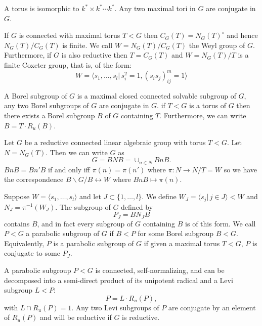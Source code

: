 A torus is isomorphic to $k^*\times k^*\cdots k^*$. Any two maximal tori in $G$ are conjugate in $G$. 

If $G$ is connected with maximal torus $T<G$ then $C_G(T) = N_G(T)^\circ$ and hence $N_G(T)/C_G(T)$ is finite. We call $W = N_G(T)/C_G(T)$ the Weyl group of $G$. Furthermore, if $G$ is also reductive then $T=C_G(T)$ and $W = N_G(T)/T$ is a finite Coxeter group, that is, of the form:
\begin{displaymath}
	W = \langle s_1, \ldots, s_l |\, s_i^2 = 1, (s_is_j)^m_{ij} = 1\rangle
\end{displaymath}

A Borel subgroup of $G$ is a maximal closed connected solvable subgroup of $G$, any two Borel subgroups of $G$ are conjugate in $G$. if $T < G$ is a torus of $G$ then there exists a Borel subgroup $B$ of $G$ containing $T$. Furthermore, we can write $B = T\cdot R_u(B)$.

Let $G$ be a reductive connected linear algebraic group with torus $T < G$. Let $N = N_G(T)$. Then we can write $G$ as
\begin{displaymath}
	G = BNB = \cup_{n\in N}BnB.
\end{displaymath}
$BnB = Bn'B$ if and only iff $\pi(n)=\pi(n')$ where $\pi:N\rightarrow N/T = W$ so we have the correspondence $B\backslash G/B \leftrightarrow W$ where $BnB \mapsto \pi(n)$.

Suppose $W = \langle s_1, \ldots, s_l\rangle$ and let $J \subset \{1, \ldots, l\}$. We define $W_J = \langle s_j |\, j\in J\rangle < W$ and $N_J = \pi^{-1}(W_J)$. The subgroup of $G$ defined by
\begin{displaymath}
	P_J = BN_JB
\end{displaymath}
contains $B$, and in fact every subgroup of $G$ containing $B$ is of this form. We call $P<G$ a parabolic subgroup of $G$ if $B<P$ for some Borel subgroup $B<G$. Equivalently, $P$ is a parabolic subgroup of $G$ if given a maximal torus $T<G$, $P$ is conjugate to some $P_J$. 

A parabolic subgroup $P<G$ is connected, self-normalizing, and can be decomposed into a semi-direct product of its unipotent radical and a Levi subgroup $L<P$:
\begin{displaymath}
	P = L\cdot R_u(P),
\end{displaymath}
with $L\cap R_u(P) = 1$. Any two Levi subgroups of $P$ are conjugate by an element of $R_u(P)$ and will be reductive if $G$ is reductive.

